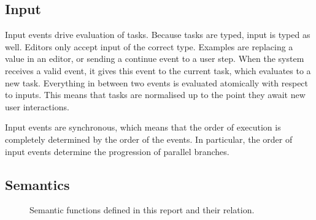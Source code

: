\subsection{Input}

Input events drive evaluation of tasks.
Because tasks are typed, input is typed as well.
Editors only accept input of the correct type.
Examples are replacing a value in an editor,
or sending a continue event to a user step.
When the system receives a valid event, it gives this event to the current task, which evaluates to a new task.
Everything in between two events is evaluated atomically with respect to inputs.
This means that tasks are normalised up to the point they await new user interactions.

Input events are synchronous, which means that the order of execution is completely determined by the order of the events.
In particular, the order of input events determine the progression of parallel branches.


\subsection{Semantics}

\begin{figure}[h]
\centering
{}
    \caption{
      Semantic functions defined in this report and their relation.
    }
    \label{fig:semantic-functions}
  \end{figure}
